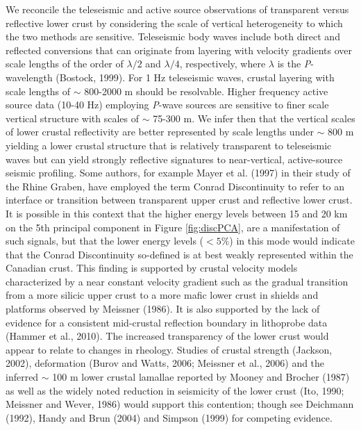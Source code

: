 \documentclass[msc,oneside]{ubcthesis}
\begin{document}
We reconcile the teleseismic and active source observations of transparent versus reflective lower crust by considering the scale of vertical heterogeneity to which the two methods are sensitive. Teleseismic body waves include both direct and reflected conversions that can originate from layering with velocity gradients over scale lengths of the order of $\lambda/2$ and $\lambda/4$, respectively, where $\lambda$ is the {\it P}-wavelength (Bostock, 1999). For 1 Hz teleseismic waves, crustal layering with scale lengths of $\sim$ 800-2000 m should be resolvable. Higher frequency active source data (10-40 Hz) employing {\it P}-wave sources are sensitive to finer scale vertical structure with scales of $\sim$ 75-300 m. We infer then that the vertical scales of lower crustal reflectivity are better represented by scale lengths under $\sim$ 800 m yielding a lower crustal structure that is relatively transparent to teleseismic waves but can yield strongly reflective signatures to near-vertical, active-source seismic profiling.  Some authors, for example Mayer et al. (1997) in their study of the Rhine Graben, have employed the term Conrad Discontinuity to refer to an interface or transition between transparent upper crust and reflective lower crust. It is possible in this context that the higher energy levels between 15 and 20 km on the 5th principal component in Figure \ref{fig:discPCA}, are a manifestation of such signals, but that the lower energy levels ($<5\%$) in this mode would indicate that the Conrad Discontinuity so-defined is at best weakly represented within the Canadian crust. This finding is supported by crustal velocity models characterized by a near constant velocity gradient such as the gradual transition from a more silicic upper crust to a more mafic lower crust in shields and platforms observed by Meissner (1986). It is also supported by the lack of evidence for a consistent mid-crustal reflection boundary in {\sc lithoprobe} data (Hammer et al., 2010). The increased transparency of the lower crust would appear to relate to changes in rheology. Studies of crustal strength (Jackson, 2002), deformation (Burov and Watts, 2006; Meissner et al., 2006) and the inferred $\sim$ 100 m lower crustal lamallae reported by Mooney and Brocher (1987) as well as the widely noted reduction in seismicity of the lower crust (Ito, 1990; Meissner and Wever, 1986) would support this contention; though see Deichmann (1992), Handy and Brun (2004) and Simpson (1999) for competing evidence.
\end{document}
